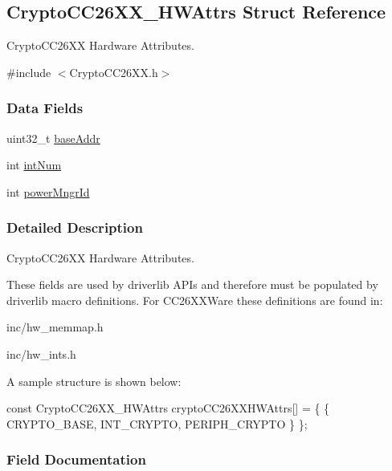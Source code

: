 \subsection{Crypto\+C\+C26\+X\+X\+\_\+\+H\+W\+Attrs Struct Reference}
\label{struct_crypto_c_c26_x_x___h_w_attrs}


Crypto\+C\+C26\+X\+X Hardware Attributes.  




{\ttfamily \#include $<$Crypto\+C\+C26\+X\+X.\+h$>$}

\subsubsection*{Data Fields}
\begin{DoxyCompactItemize}
\item 
uint32\+\_\+t \hyperlink{struct_crypto_c_c26_x_x___h_w_attrs_a8a6e2dbc65c24f641941ebe3c854e961}{base\+Addr}
\item 
int \hyperlink{struct_crypto_c_c26_x_x___h_w_attrs_a63cdd84637d1e9acca0315cd96d9891b}{int\+Num}
\item 
int \hyperlink{struct_crypto_c_c26_x_x___h_w_attrs_ac5c27633092355d3606d6d0b240b2091}{power\+Mngr\+Id}
\end{DoxyCompactItemize}


\subsubsection{Detailed Description}
Crypto\+C\+C26\+X\+X Hardware Attributes. 

These fields are used by driverlib A\+P\+Is and therefore must be populated by driverlib macro definitions. For C\+C26\+X\+X\+Ware these definitions are found in\+:
\begin{DoxyItemize}
\item inc/hw\+\_\+memmap.\+h
\item inc/hw\+\_\+ints.\+h
\end{DoxyItemize}

A sample structure is shown below\+: 
\begin{DoxyCode}
\textcolor{keyword}{const} CryptoCC26XX_HWAttrs cryptoCC26XXHWAttrs[] = \{
    \{
        CRYPTO\_BASE,
        INT\_CRYPTO,
        PERIPH\_CRYPTO
    \}
\};
\end{DoxyCode}
 

\subsubsection{Field Documentation}
